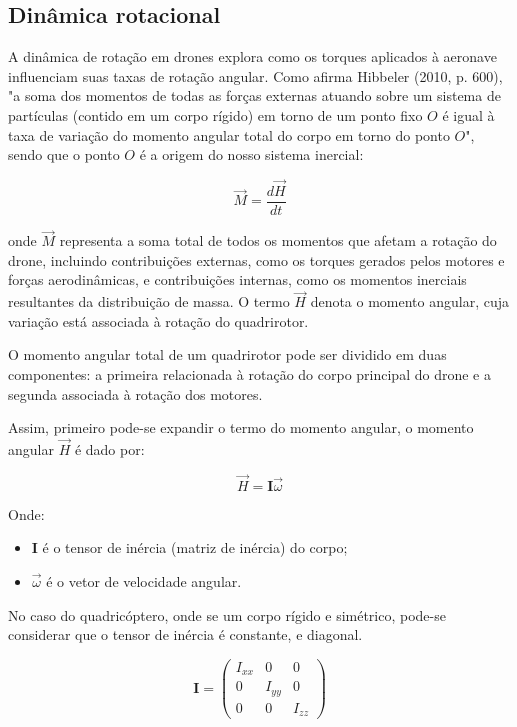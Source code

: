 \subsection{Dinâmica rotacional}

A dinâmica de rotação em drones explora como os torques aplicados à aeronave influenciam suas taxas de rotação angular. Como afirma Hibbeler (2010, p. 600), "a soma dos momentos de todas as forças externas atuando sobre um sistema de partículas (contido em um corpo rígido) em torno de um ponto fixo \(O\) é igual à taxa de variação do momento angular total do corpo em torno do ponto \(O\)", sendo que o ponto \(O\) é a origem do nosso sistema inercial:

\[
\vec{M} = \frac{d\vec{H}}{dt}
\]

onde \(\vec{M}\) representa a soma total de todos os momentos que afetam a rotação do drone, incluindo contribuições externas, como os torques gerados pelos motores e forças aerodinâmicas, e contribuições internas, como os momentos inerciais resultantes da distribuição de massa. O termo \(\vec{H}\) denota o momento angular, cuja variação está associada à rotação do quadrirotor.

O momento angular total de um quadrirotor pode ser dividido em duas componentes: a primeira relacionada à rotação do corpo principal do drone e a segunda associada à rotação dos motores.

Assim, primeiro pode-se expandir o termo do momento angular, o momento angular \(\vec{H}\) é dado por:

\begin{equation}
	\vec{H} = \mathbf{I} \vec{\omega}
\end{equation}

Onde:
\begin{itemize}
    \item \(\mathbf{I}\) é o tensor de inércia (matriz de inércia) do corpo;
    \item \(\vec{\omega}\) é o vetor de velocidade angular.
\end{itemize}

No caso do quadricóptero, onde se um corpo rígido e simétrico, pode-se considerar que o tensor de inércia é constante, e diagonal. 

\[
	\boldsymbol{I} = \begin{pmatrix}
		I_{xx} & 0      & 0      \\
		0      & I_{yy} & 0      \\
		0      & 0      & I_{zz}
	\end{pmatrix}
\]

